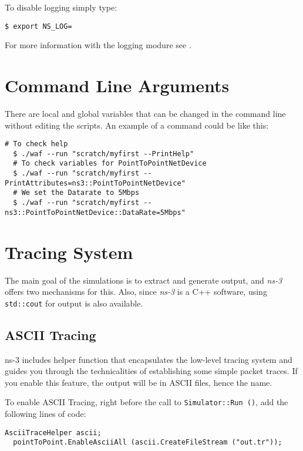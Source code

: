 To disable logging simply type:

\begin{lstlisting}[escapechar=@, language=myshell,caption={Disabling logging in ns-3}, captionpos=b]
  $ export NS_LOG=
\end{lstlisting}

For more information with the logging modure see \cite{ns3}.

\section{Command Line Arguments}
There are local and global variables that can be changed in the command line without
editing the scripts. An example of a command could be like this:

\begin{lstlisting}[escapechar=@, language=myshell,caption={Command line arguments}, captionpos=b]
  # To check help 
  $ ./waf --run "scratch/myfirst --PrintHelp"
  # To check variables for PointToPointNetDevice
  $ ./waf --run "scratch/myfirst --PrintAttributes=ns3::PointToPointNetDevice"
  # We set the Datarate to 5Mbps
  $ ./waf --run "scratch/myfirst --ns3::PointToPointNetDevice::DataRate=5Mbps"
\end{lstlisting}

\section{Tracing System}
The main goal of the simulations is to extract and generate output, and \textit{ns-3} offers two
mechanisms for this. Also, since \textit{ns-3} is a C++ software, using \texttt{std::cout} for
output is also available.

\subsection{ASCII Tracing}
ns-3 includes helper function that encapsulates the low-level tracing system and guides you 
through the technicalities of establishing some simple packet traces. If you enable this feature, 
the output will be in ASCII files, hence the name.

To enable ASCII Tracing, right before the call to \texttt{Simulator::Run ()}, add the following lines
of code:

\begin{lstlisting}[escapechar=@, language=myC++,caption={ASCII Tracing}, captionpos=b]
  AsciiTraceHelper ascii;
  pointToPoint.EnableAsciiAll (ascii.CreateFileStream ("out.tr"));
\end{lstlisting}

